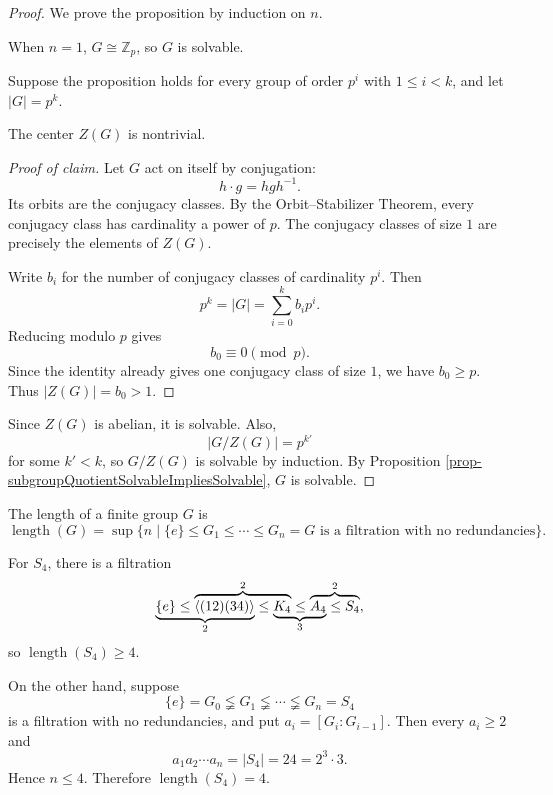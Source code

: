 \begin{proof}
    We prove the proposition by induction on $n$.

    When $n=1$, $G\cong\mathbb Z_p$, so $G$ is solvable.

    Suppose the proposition holds for every group of order $p^i$ with $1\leq i<k$, and let $|G|=p^k$.

    \begin{claim}
        The center $Z(G)$ is nontrivial.
    \end{claim}

    \begin{proof}[Proof of claim]
        Let $G$ act on itself by conjugation:
        \[
        h\cdot g=hgh^{-1}.
        \]
        Its orbits are the conjugacy classes. By the Orbit--Stabilizer Theorem,
        every conjugacy class has cardinality a power of $p$. The conjugacy classes of size $1$ are precisely the elements of $Z(G)$.

        Write $b_i$ for the number of conjugacy classes of cardinality $p^i$. Then
        \[
        p^k=|G|=\sum_{i=0}^k b_i p^i.
        \]
        Reducing modulo $p$ gives
        \[
        b_0\equiv 0\pmod p.
        \]
        Since the identity already gives one conjugacy class of size $1$, we have $b_0\geq p$. Thus $|Z(G)|=b_0>1$.
    \end{proof}

    Since $Z(G)$ is abelian, it is solvable. Also,
    \[
    |G/Z(G)|=p^{k'}
    \]
    for some $k'<k$, so $G/Z(G)$ is solvable by induction. By Proposition
    \ref{prop-subgroupQuotientSolvableImpliesSolvable}, $G$ is solvable.
\end{proof}

\begin{definition}
    The length of a finite group $G$ is
    \[
    \operatorname{length}(G)
    =\sup\{n\mid \{e\}\leq G_1\leq\cdots\leq G_n=G
    \text{ is a filtration with no redundancies}\}.
    \]
\end{definition}

\begin{example}
    For $S_4$, there is a filtration
    \[
    \lefteqn{\underbrace{\phantom{\{e\}\leq\langle(12)(34)\rangle}}_{2}}
    \{e\}\leq
    \overbrace{\langle(12)(34)\rangle\leq
    \lefteqn{\underbrace{\phantom{K_4\leq A_4}}_{3}}K_4}^{2}
    \leq \overbrace{A_4\leq S_4}^{2},
    \]
    so $\operatorname{length}(S_4)\geq 4$.

    On the other hand, suppose
    \[
    \{e\}=G_0\lneqq G_1\lneqq\cdots\lneqq G_n=S_4
    \]
    is a filtration with no redundancies, and put $a_i=[G_i:G_{i-1}]$.
    Then every $a_i\geq 2$ and
    \[
    a_1a_2\cdots a_n=|S_4|=24=2^3\cdot 3.
    \]
    Hence $n\leq 4$. Therefore $\operatorname{length}(S_4)=4$.
\end{example}

